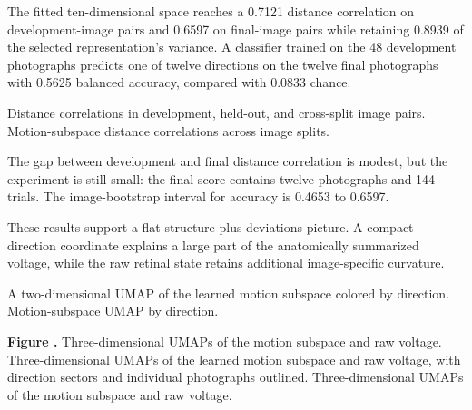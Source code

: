 \documentclass[11pt]{article}
\begin{document}
The fitted ten-dimensional space reaches a 0.7121 distance correlation on development-image pairs and 0.6597 on final-image pairs while retaining 0.8939 of the selected representation's variance. A classifier trained on the 48 development photographs predicts one of twelve directions on the twelve final photographs with 0.5625 balanced accuracy, compared with 0.0833 chance.

  {Distance correlations in development, held-out, and cross-split image pairs.}
  {Motion-subspace distance correlations across image splits.}

The gap between development and final distance correlation is modest, but the experiment is still small: the final score contains twelve photographs and 144 trials. The image-bootstrap interval for accuracy is 0.4653 to 0.6597.

These results support a flat-structure-plus-deviations picture. A compact direction coordinate explains a large part of the anatomically summarized voltage, while the raw retinal state retains additional image-specific curvature.

  {A two-dimensional UMAP of the learned motion subspace colored by direction.}
  {Motion-subspace UMAP by direction.}

\ifdefined\HCode
  \ifvmode\IgnorePar\fi\EndP
  \textbf{Figure \thefigure.} Three-dimensional UMAPs of the motion subspace and raw voltage.%
  \ShowPar
\else
    {Three-dimensional UMAPs of the learned motion subspace and raw voltage, with direction sectors and individual photographs outlined.}
    {Three-dimensional UMAPs of the motion subspace and raw voltage.}
\fi
\end{document}
